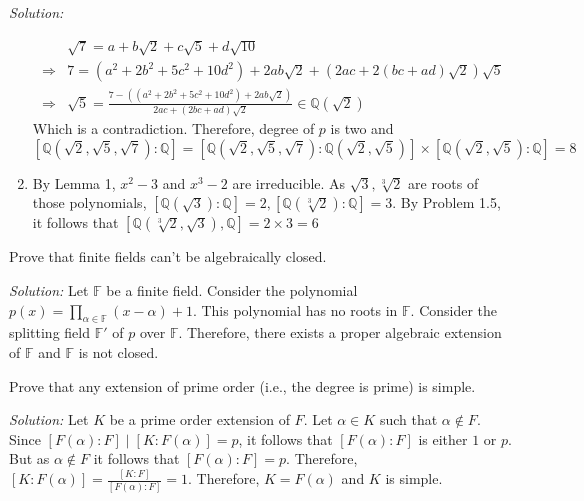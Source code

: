 \documentclass[a4paper, 11pt]{article}
\newenvironment{solution}
    {\textit{Solution:}}
    {}
\begin{document}
\begin{solution}
\begin{enumerate}
    \begin{align*}
        &\sqrt 7=a+b\sqrt2+c\sqrt5+d\sqrt{10}\\
        \Rightarrow&7=(a^2+2b^2+5c^2+10d^2)+2ab\sqrt2+\left(2ac+2(bc+ad)\sqrt2\right)\sqrt 5\\
        \Rightarrow&\sqrt5=\frac{7-\left((a^2+2b^2+5c^2+10d^2)+2ab\sqrt2\right)}{2ac+\left(2bc+ad\right)\sqrt2}\in\mathbb{Q}(\sqrt 2)
    \end{align*}
    Which is a contradiction. Therefore, degree of $p$ is two and 
    $$[\mathbb Q(\sqrt 2,\sqrt5,\sqrt 7):\mathbb Q]=[\mathbb Q(\sqrt 2,\sqrt5,\sqrt7):\mathbb Q(\sqrt 2,\sqrt 5)]\times [\mathbb Q(\sqrt 2,\sqrt 5):\mathbb Q]=8$$
    \item  By Lemma 1, $x^2-3$ and $x^3-2$ are irreducible. As $\sqrt3,\sqrt[3]2$ are roots of those polynomials, $[\mathbb Q(\sqrt 3):\mathbb Q]=2,[\mathbb Q(\sqrt[3] 2):\mathbb Q]=3$. By Problem 1.5, it follows that $[\mathbb{Q}(\sqrt[3]2,\sqrt3),\mathbb{Q}]=2\times3=6$
\end{enumerate}
\end{solution} 







\begin{tcolorbox}[colback=c2,colframe=c1,title=Problem 1.2]
    Prove that finite fields can't be algebraically closed.
\end{tcolorbox}
\begin{solution}
    Let $\mathbb F$ be a finite field. Consider the polynomial $p(x)=\prod_{\alpha\in\mathbb F}(x-\alpha)+1$. This polynomial has no roots in $\mathbb F$. Consider the splitting field $\mathbb F'$ of $p$ over $\mathbb F$. Therefore, there exists a proper algebraic extension of $\mathbb F$ and $\mathbb F$ is not closed.
\end{solution}




\begin{tcolorbox}[colback=c2,colframe=c1,title=Problem 1.3]
    Prove that any extension of prime order (i.e., the degree is prime) is simple.
\end{tcolorbox}
\begin{solution}
    Let $K$ be a prime order extension of $F$. Let $\alpha\in K$ such that $\alpha\notin F$. Since ${[F(\alpha):F]\mid[K:F(\alpha)]=p}$, it follows that $[F(\alpha):F]$ is either $1$ or $p$. But as $\alpha\notin F$ it follows that $[F(\alpha):F]=p$. Therefore, 
    ${[K:F(\alpha)]=\frac{[K:F]}{[F(\alpha):F]}}=1$. Therefore, $K=F(\alpha)$ and $K$ is simple. 
\end{solution}
\end{document}

